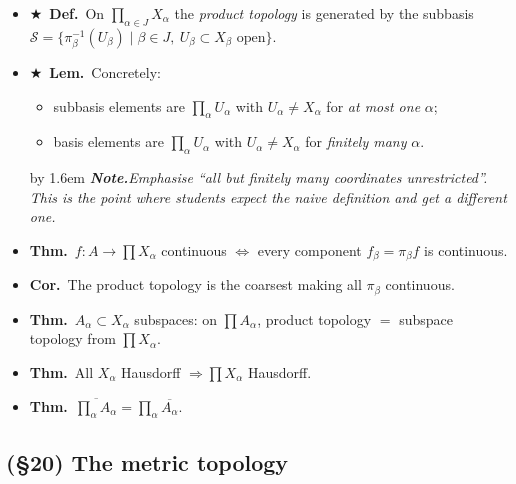 \documentclass[12pt,a4paper]{article}
\newcommand{\Dfn}{\textbf{Def.}~}
\newcommand{\Thm}{\textbf{Thm.}~}
\newcommand{\Lem}{\textbf{Lem.}~}
\newcommand{\Cor}{\textbf{Cor.}~}
\newcommand{\Key}{$\bigstar$~}                  %
\newcommand{\Cue}[1]{%
  \par\addvspace{7pt}\nopagebreak
  \begingroup
    \advance\leftskip by 1.6em
    \parindent=0pt \small\color{cue}%
    \textbf{\textit{Note.}}\enspace \textit{#1}\par
  \endgroup
  \addvspace{9pt}}
\newenvironment{BL}%
  {\begin{itemize}[leftmargin=1.4em,labelsep=0.55em,itemsep=11pt,topsep=11pt,parsep=0pt]}%
  {\end{itemize}}
\newenvironment{SB}%
  {\begin{itemize}[label=--,leftmargin=1.3em,labelsep=0.45em,itemsep=6pt,topsep=7pt,parsep=0pt]}%
  {\end{itemize}}
\newcommand{\cS}{\mathcal{S}}
\renewcommand{\iff}{\Leftrightarrow}
\newcommand{\imp}{\Rightarrow}
\begin{document}
\begin{BL}
\item \Key\Dfn On $\prod_{\alpha\in J}X_\alpha$ the \emph{product topology} is generated by the
      subbasis
      \(\cS=\{\pi_\beta^{-1}(U_\beta)\mid\beta\in J,\ U_\beta\subset X_\beta\text{ open}\}.\)
\item \Key\Lem Concretely:
  \begin{SB}
  \item subbasis elements are $\prod_\alpha U_\alpha$ with $U_\alpha\neq X_\alpha$
        for \emph{at most one} $\alpha$;
  \item basis elements are $\prod_\alpha U_\alpha$ with $U_\alpha\neq X_\alpha$
        for \emph{finitely many} $\alpha$.
  \end{SB}
\Cue{Emphasise ``all but finitely many coordinates unrestricted''. This is the point where
students expect the naive definition and get a different one.}
\item \Thm $f\colon A\to\prod X_\alpha$ continuous $\iff$ every component $f_\beta=\pi_\beta f$
      is continuous.
\item \Cor The product topology is the coarsest making all $\pi_\beta$ continuous.
\item \Thm $A_\alpha\subset X_\alpha$ subspaces: on $\prod A_\alpha$, product topology
      $=$ subspace topology from $\prod X_\alpha$.
\item \Thm All $X_\alpha$ Hausdorff $\imp\prod X_\alpha$ Hausdorff.
\item \Thm $\overline{\prod_\alpha A_\alpha}=\prod_\alpha\overline{A_\alpha}$.
\end{BL}

\subsection{(\S20) The metric topology}
\end{document}
